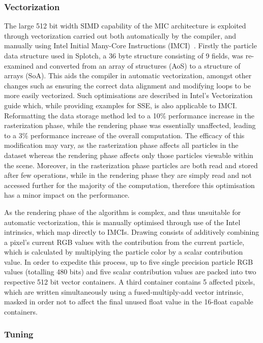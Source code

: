 \documentclass[runningheads,a4paper]{llncs}
\begin{document}
\subsubsection{Vectorization}
\label{sect:vectorization}

The large 512 bit width SIMD capability of the MIC architecture is exploited through vectorization carried out both 
automatically by the compiler, and manually using Intel Initial Many-Core Instructions (IMCI)~\cite{imci}. Firstly the 
particle data structure used in Splotch, a 36 byte structure consisting of 9 fields, was re-examined and converted from an 
array of structures (AoS) to a structure of arrays (SoA). This aids the compiler in automatic vectorization, 
amongst other changes such as ensuring the correct data alignment and modifying loops to be more easily vectorized. 
Such optimisations are described in Intel's Vectorization guide \cite{vectorguide} which, while providing examples for SSE, is also 
applicable to IMCI. Reformatting the data storage method led to a 10\% performance increase in the rasterization phase, 
while the rendering phase was essentially unaffected, leading to a 3\% performance increase of the overall computation. 
The efficacy of this modification may vary, as the rasterization phase affects all particles in the dataset whereas the rendering phase 
affects only those particles viewable within the scene. Moreover, in the rasterization phase particles are both read and stored after few 
operations, while in the rendering phase they are simply read and not accessed further for the majority of the computation, therefore 
this optimisation has a minor impact on the performance.

As the rendering phase of the algorithm is complex, and thus unsuitable for automatic vectorization, this is manually 
optimised through use of the Intel intrinsics, which map directly to IMCIs. Drawing consists of additively 
combining a pixel's current RGB values with the contribution from the current particle, which is calculated by 
multiplying the particle color by a scalar contribution value. In order to expedite this process, up to five single 
precision particle RGB values (totalling 480 bits) and five scalar contribution values are packed into two respective 
512 bit vector containers. A third container contains 5 affected pixels, which are written simultaneously using a 
fused-multiply-add vector intrinsic, masked in order not to affect the final unused float value in the 16-float 
capable containers.

\subsubsection{Tuning}
\label{sect:tuning}
\end{document}
